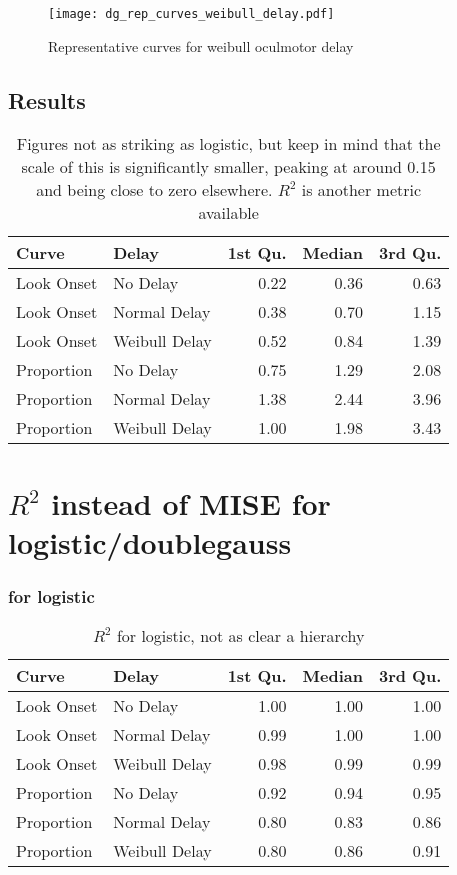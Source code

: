 \begin{figure}[H]
\centering
\texttt{[image: dg\_rep\_curves\_weibull\_delay.pdf]}
\caption{Representative curves for weibull oculmotor delay}
\label{fig:dg_rep_curves_weibull_delay}
\end{figure}
\subsection{Results}

\begin{table}[ht]
\centering
\begin{tabular}{llrrr}
  \hline
Curve & Delay & 1st Qu. & Median & 3rd Qu. \\ 
  \hline
Look Onset & No Delay & 0.22 & 0.36 & 0.63 \\ 
  Look Onset & Normal Delay & 0.38 & 0.70 & 1.15 \\ 
  Look Onset & Weibull Delay & 0.52 & 0.84 & 1.39 \\ 
  Proportion & No Delay & 0.75 & 1.29 & 2.08 \\ 
  Proportion & Normal Delay & 1.38 & 2.44 & 3.96 \\ 
  Proportion & Weibull Delay & 1.00 & 1.98 & 3.43 \\ 
   \hline
\end{tabular}
\caption{Figures not as striking as logistic, but keep in mind that the scale of this is significantly smaller, peaking at around 0.15 and being close to zero elsewhere. $R^2$ is another metric available}
\label{tab:dg_mise_sims}
\end{table}

\section*{$R^2$ instead of MISE for logistic/doublegauss}


\subsubsection{for logistic}

\begin{table}[H]
\centering
\begin{tabular}{llrrr}
  \hline
Curve & Delay & 1st Qu. & Median & 3rd Qu. \\ 
  \hline
Look Onset & No Delay & 1.00 & 1.00 & 1.00 \\ 
  Look Onset & Normal Delay & 0.99 & 1.00 & 1.00 \\ 
  Look Onset & Weibull Delay & 0.98 & 0.99 & 0.99 \\ 
  Proportion & No Delay & 0.92 & 0.94 & 0.95 \\ 
  Proportion & Normal Delay & 0.80 & 0.83 & 0.86 \\ 
  Proportion & Weibull Delay & 0.80 & 0.86 & 0.91 \\ 
   \hline
\end{tabular}
\caption{$R^2$ for logistic, not as clear a hierarchy}
\label{tab:r2_logistic_sims}
\end{table}


